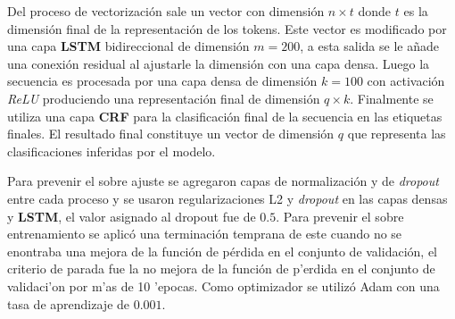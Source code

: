 Del proceso de vectorización sale un vector con dimensión $n \times t$ donde $t$ es la dimensión final de la representación
de los tokens. Este vector es modificado por una capa \textbf{LSTM} bidireccional de dimensión $m=200$, a esta salida se le 
añade una conexión residual al ajustarle la dimensión con una capa densa. Luego la secuencia es procesada por una 
capa densa de dimensión $k=100$ con activación \emph{ReLU} produciendo una representación final de dimensión 
$q \times k$. Finalmente se utiliza una capa \textbf{CRF}
para la clasificación final de la secuencia en las etiquetas finales. El resultado final constituye un vector
de dimensión $q$ que representa las clasificaciones inferidas por el modelo.

Para prevenir el sobre ajuste se agregaron capas de normalización y de \emph{dropout} entre cada proceso y se usaron regularizaciones
L2 y \emph{dropout} en las capas densas y \textbf{LSTM}, el valor asignado al dropout fue de $0.5$. 
Para prevenir el sobre entrenamiento se aplicó una 
terminación temprana de este cuando no se enontraba una mejora de la función de pérdida en el conjunto de validación,
el criterio de parada fue la no mejora de la función de p'erdida en el conjunto de validaci'on por m'as de 10 'epocas.
Como optimizador se utilizó Adam con una tasa de aprendizaje de $0.001$.

\newpage

